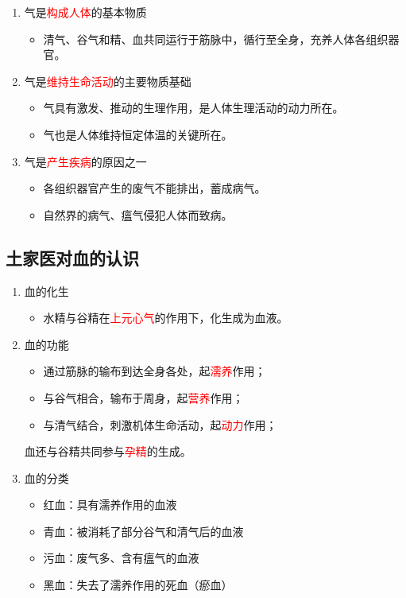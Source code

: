 \documentclass[cn,blue,12pt,normal,founder]{elegantnote}
\newcommand{\redt}[1]{\textcolor{red}{{}#1}}      %
\begin{document}
\begin{enumerate}
  \item 气是\redt{构成人体}的基本物质
  \begin{itemize}
    \item 清气、谷气和精、血共同运行于筋脉中，循行至全身，充养人体各组织器官。
  \end{itemize}
  \item 气是\redt{维持生命活动}的主要物质基础
  \begin{itemize}
    \item 气具有激发、推动的生理作用，是人体生理活动的动力所在。
    \item 气也是人体维持恒定体温的关键所在。
  \end{itemize}
  \item 气是\redt{产生疾病}的原因之一
  \begin{itemize}
    \item 各组织器官产生的废气不能排出，蓄成病气。
    \item 自然界的病气、瘟气侵犯人体而致病。
  \end{itemize}
\end{enumerate}

\subsection{土家医对血的认识}

\begin{enumerate}
  \item 血的化生
  \begin{itemize}
    \item 水精与谷精在\redt{上元心气}的作用下，化生成为血液。
  \end{itemize}
  \item 血的功能
  \begin{itemize}
    \item 通过筋脉的输布到达全身各处，起\redt{濡养}作用；
    \item 与谷气相合，输布于周身，起\redt{营养}作用；
    \item 与清气结合，刺激机体生命活动，起\redt{动力}作用；
  \end{itemize}
  \begin{note}
    血还与谷精共同参与\redt{孕精}的生成。
  \end{note}
  \item 血的分类
  \begin{itemize}
    \item 红血：具有濡养作用的血液
    \item 青血：被消耗了部分谷气和清气后的血液
    \item 污血：废气多、含有瘟气的血液
    \item 黑血：失去了濡养作用的死血（瘀血）
  \end{itemize}
\end{enumerate}
\end{document}
